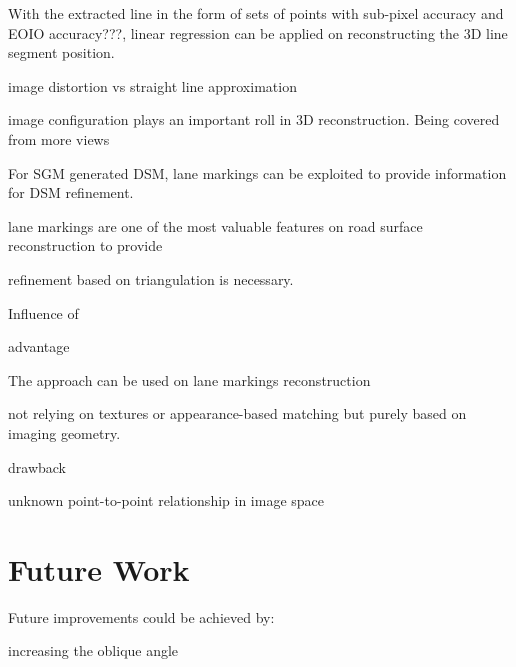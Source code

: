 With the extracted line in the form of sets of points with sub-pixel accuracy and EOIO accuracy???, linear regression can be applied on reconstructing the 3D line segment position.

image distortion vs straight line approximation


image configuration plays an important roll in 3D reconstruction. Being covered from more views



For SGM generated DSM, lane markings can be exploited to provide information for DSM refinement. 

lane markings are one of the most valuable features on road surface reconstruction to provide 

 refinement based on triangulation is necessary.



Influence of 


advantage

The approach can be used on lane markings reconstruction

not relying on textures or appearance-based matching
but purely based on imaging geometry.

drawback

unknown point-to-point relationship in image space




\section*{Future Work}
\label{chap:futurework}

Future improvements could be achieved by:

increasing the oblique angle


